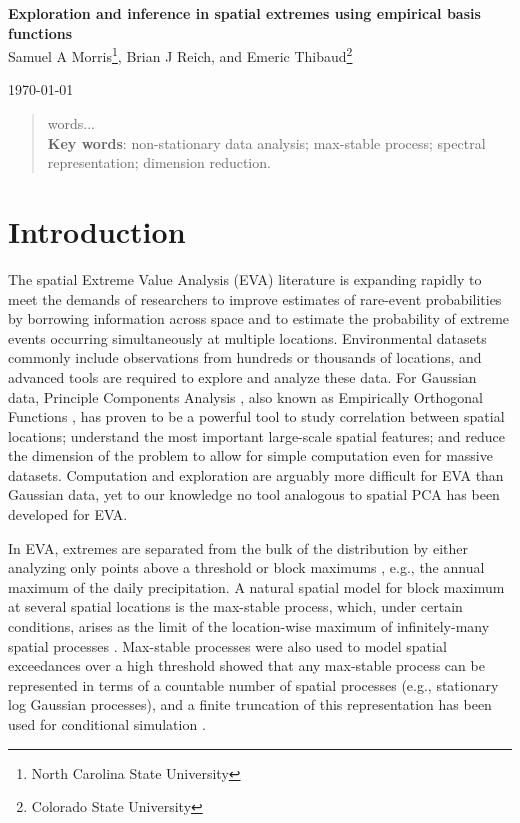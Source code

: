 \documentclass[11pt]{article}
\begin{document}
\linenumbers
\pagestyle{empty}
\begin{center}
{\Large {\bf Exploration and inference in spatial extremes using empirical basis functions}}\\

{\large Samuel A Morris\footnote[1]{North Carolina State University}, Brian J Reich\footnotemark[1]{}, and Emeric Thibaud\footnote[2]{Colorado State University}}

\today
\end{center}


\begin{abstract}
	words...\\
	{\bf Key words}: non-stationary data analysis; max-stable process; spectral representation; dimension reduction.

\end{abstract}
\newpage
\pagestyle{plain}
\setcounter{page}{1}

\section{Introduction}\label{ebs:intro}
The spatial Extreme Value Analysis (EVA) literature is expanding rapidly \citep{Davison2012} to meet the demands of researchers to improve estimates of rare-event probabilities by borrowing information across space and to estimate the probability of extreme events occurring simultaneously at multiple locations.
Environmental datasets commonly include observations from hundreds or thousands of locations, and advanced tools are required to explore and analyze these data.
For Gaussian data, Principle Components Analysis \citep[PCA]{Everitt2008}, also known as Empirically Orthogonal Functions \citep[EOF]{Toggweiler2001}, has proven to be a powerful tool to study correlation between spatial locations; understand the most important large-scale spatial features; and reduce the dimension of the problem to allow for simple computation even for massive datasets.
Computation and exploration are arguably more difficult for EVA than Gaussian data, yet to our knowledge no tool analogous to spatial PCA has been developed for EVA.

In EVA, extremes are separated from the bulk of the distribution by either analyzing only points above a threshold or block maximums \citep{Coles2001}, e.g., the annual maximum of the daily precipitation.
A natural spatial model for block maximum at several spatial locations is the max-stable process, which, under certain conditions, arises as the limit of the location-wise maximum of infinitely-many spatial processes \citep{deHaan2006}.
Max-stable processes were also used to model spatial exceedances over a high threshold \citep{Thibaud2013,Huser2014}
 showed that any max-stable process can be represented in terms of a countable number of spatial processes (e.g., stationary log Gaussian processes), and a finite truncation of this representation has been used for conditional simulation \citep{Wang2011}.
\end{document}
